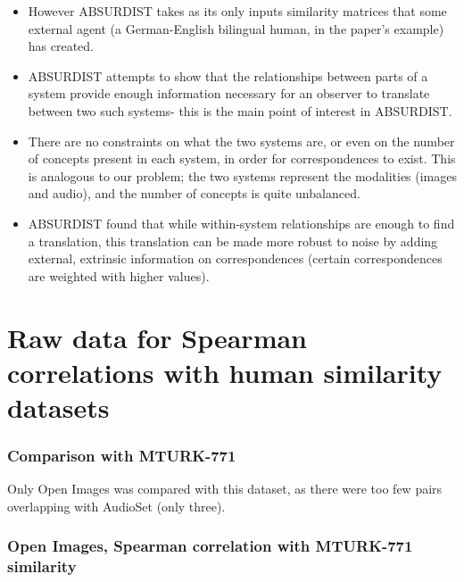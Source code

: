 \begin{itemize}
\begin{itemize}
            \item However ABSURDIST takes as its only inputs similarity matrices that some external agent (a German-English bilingual human, in the paper's example) has created. 
            \item ABSURDIST attempts to show that the relationships between parts of a system provide enough information necessary for an observer to translate between two such systems- this is the main point of interest in ABSURDIST. 
            \item There are no constraints on what the two systems are, or even on the number of concepts present in each system, in order for correspondences to exist. This is analogous to our problem; the two systems represent the modalities (images and audio), and the number of concepts  is quite unbalanced. 
            \item ABSURDIST found that while within-system relationships are enough to find a translation, this translation can be made more robust to noise by adding external, extrinsic information on correspondences (certain correspondences are weighted with higher values). 
        \end{itemize}
    \end{itemize}
    
    
    
\section{Raw data for Spearman correlations with human similarity datasets}
    
    

\subsubsection{Comparison with MTURK-771}



Only Open Images was compared with this dataset, as there were too few pairs overlapping with AudioSet (only three). 

\subsubsection{Open Images, Spearman correlation with MTURK-771 similarity}\\

